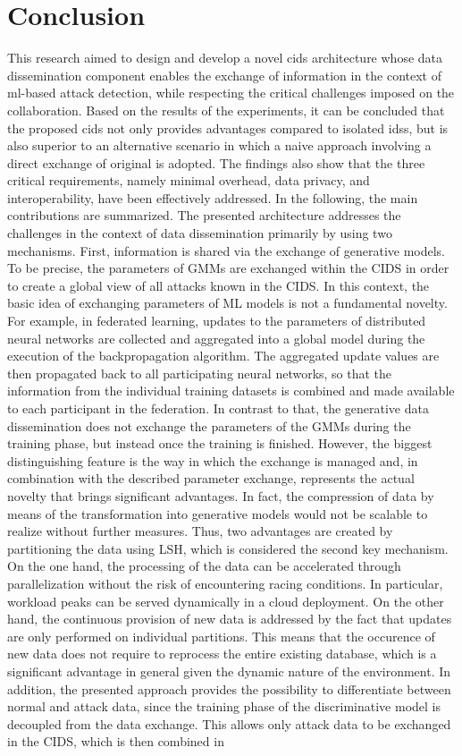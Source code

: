 \documentclass[../../main.tex]{subfiles}
\begin{document}
\section{Conclusion}\label{sec:conclusion}
This research aimed to design and develop a novel \gls{cids} architecture whose data dissemination component enables the exchange of information in the context of \gls{ml}-based attack detection, while respecting the critical challenges imposed on the collaboration. Based on the results of the experiments, it can be concluded that the proposed \gls{cids} not only provides advantages compared to isolated \glspl{ids}, but is also superior to an alternative scenario in which a naive approach involving a direct exchange of original is adopted. The findings also show that the three critical requirements, namely minimal overhead, data privacy, and interoperability, have been effectively addressed. In the following, the main contributions are summarized. The presented architecture addresses the challenges in the context of data dissemination primarily by using two mechanisms. First, information is shared via the exchange of generative models. To be precise, the parameters of GMMs are exchanged within the CIDS in order to create a global view of all attacks known in the CIDS. In this context, the basic idea of exchanging parameters of ML models is not a fundamental novelty. For example, in federated learning, updates to the parameters of distributed neural networks are collected and aggregated into a global model during the execution of the backpropagation algorithm. The aggregated update values are then propagated back to all participating neural networks, so that the information from the individual training datasets is combined and made available to each participant in the federation. In contrast to that, the generative data dissemination does not exchange the parameters of the GMMs during the training phase, but instead once the training is finished. However, the biggest distinguishing feature is the way in which the exchange is managed and, in combination with the described parameter exchange, represents the actual novelty that brings significant advantages. In fact, the compression of data by means of the transformation into generative models would not be scalable to realize without further measures. Thus, two advantages are created by partitioning the data using LSH, which is considered the second key mechanism. On the one hand, the processing of the data can be accelerated through parallelization without the risk of encountering racing conditions. In particular, workload peaks can be served dynamically in a cloud deployment. On the other hand, the continuous provision of new data is addressed by the fact that updates are only performed on individual partitions. This means that the occurence of new data does not require to reprocess the entire existing database, which is a significant advantage in general given the dynamic nature of the environment. In addition, the presented approach provides the possibility to differentiate between normal and attack data, since the training phase of the discriminative model is decoupled from the data exchange. This allows only attack data to be exchanged in the CIDS, which is then combined in 
\end{document}
